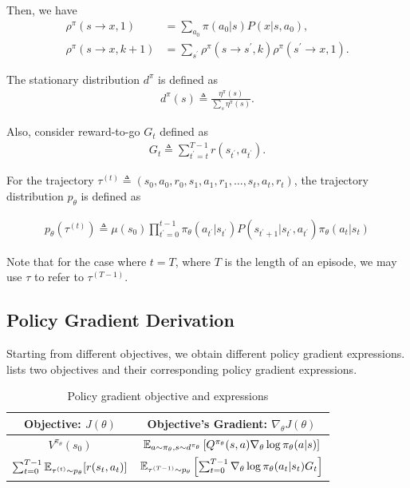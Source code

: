 \documentclass{article}
\begin{document}
Then, we have
\begin{align*}
    \rho^\pi(s\to x, 1) &= \sum_{a_0} \pi(a_0|s) P(x|s, a_0),\\
    \rho^\pi(s\to x, k+1) &= \sum_{s^\prime}\rho^\pi(s\to s^\prime, k) \rho^\pi(s^\prime\to x, 1).
\end{align*}
\begin{tcolorbox}[breakable,enhanced,colback=green!3!white,colframe=green!30!black]
The stationary distribution $d^\pi$ is defined as
\begin{align*}
    d^\pi(s) \triangleq \frac{\eta^\pi(s)}{\sum_s \eta^\pi(s)}.
\end{align*}

Also, consider reward-to-go $G_t$ defined as
\begin{align*}
    G_t \triangleq \sum_{t^\prime= t}^{T-1} r(s_{t^\prime}, a_{t^\prime}).
\end{align*}

For the trajectory $\tau^{(t)}\triangleq (s_0, a_0, r_0, s_1, a_1, r_1, \ldots, s_t, a_t, r_t)$, the trajectory distribution $p_\theta$ is defined as

\begin{align*}
    p_\theta(\tau^{(t)}) \triangleq \mu(s_0)\prod_{t^\prime = 0}^{t-1} \pi_\theta(a_{t^\prime}|s_{t^\prime})P(s_{t^\prime+1}|s_{t^\prime}, a_{t^\prime}) \pi_\theta(a_t|s_t)
\end{align*}

Note that for the case where $t = T$, where $T$ is the length of an episode, we may use $\tau$ to refer to $\tau^{(T-1)}$.

\end{tcolorbox}


\subsection{Policy Gradient Derivation}

Starting from different objectives, we obtain different policy gradient expressions. lists two objectives and their corresponding policy gradient expressions.
\begin{table}[H]
    \centering
\begin{tabular}{c c}
  \textbf{Objective:} $J(\theta)$ & \textbf{Objective's Gradient:} $\nabla_\theta J(\theta)$ \\
  \hline
   $V^{\pi_\theta}(s_0)$ & ${\mathbb E}_{a \sim\pi_\theta, s\sim d^{\pi_\theta}}\left[Q^{\pi_\theta}(s,a)\nabla_\theta \log \pi_\theta(a|s)\right]$ \\
   \arrayrulecolor{gray}\hline
    $\sum_{t=0}^{T-1} {\mathbb E}_{\tau^{(t)} \sim p_\theta}[r(s_t, a_t)]$ & ${\mathbb E}_{\tau^{(T-1)} \sim p_\theta} \left[ \sum_{t=0}^{T-1} \nabla_\theta \log \pi_\theta(a_t \vert s_t) G_t\right]$ \\  
\end{tabular}
\caption{Policy gradient objective and expressions}
\label{table:pg_exp}
\end{table}
\end{document}
